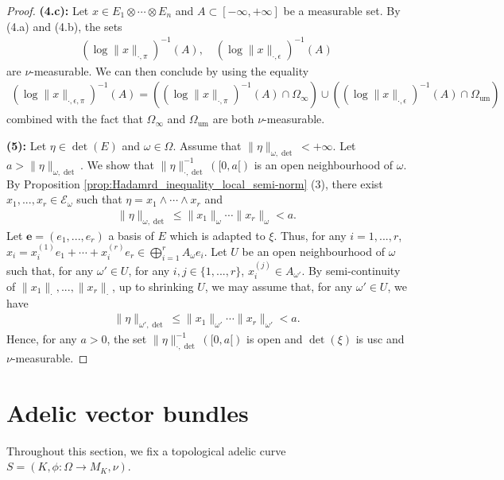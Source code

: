 \documentclass [11pt,reqno]{amsart}
\newcommand{\1}{\mathmybb{1}}
\def\cE{{\mathcal{E}}}
\def\um{\operatorname{um}}
\begin{document}
\begin{proof}
\textbf{(4.c):} Let $x\in E_1 \otimes\cdots\otimes E_n$ and $A \subset [-\infty,+\infty]$ be a measurable set. By (4.a) and (4.b), the sets
\begin{align*}
\left(\log\|x\|_{\cdot,\pi}\right)^{-1}(A), \quad \left(\log\|x\|_{\cdot,\epsilon}\right)^{-1}(A)
\end{align*}
are $\nu$-measurable. We can then conclude by using the equality
\begin{align*}
\left(\log\|x\|_{\cdot,\epsilon,\pi}\right)^{-1}(A) = \left(\left(\log\|x\|_{\cdot,\pi}\right)^{-1}(A)\cap \Omega_{\infty}\right) \cup \left(\left(\log\|x\|_{\cdot,\epsilon}\right)^{-1}(A)\cap \Omega_{\um}\right)
\end{align*}
combined with the fact that $\Omega_{\infty}$ and $\Omega_{\um}$ are both $\nu$-measurable.

\textbf{(5):} Let $\eta\in\det(E)$ and $\omega\in\Omega$. Assume that $\|\eta\|_{\omega,\det}<+\infty$. Let $a>\|\eta\|_{\omega,\det}$. We show that $\|\eta\|_{\cdot,\det}^{-1}([0,a[)$ is an open neighbourhood of $\omega$. By Proposition \ref{prop:Hadamrd_inequality_local_semi-norm} (3), there exist $x_1,...,x_r\in \cE_{\omega}$ such that $\eta=x_1\wedge\cdots\wedge x_r$ and 
\begin{align*}
\|\eta\|_{\omega,\det}\leq\|x_1\|_{\omega}\cdots\|x_r\|_{\omega} < a.
\end{align*}
Let $\mathbf{e}=(e_1,...,e_r)$ a basis of $E$ which is adapted to $\xi$. Thus, for any $i=1,...,r$, $x_i = x_{i}^{(1)}e_1 + \cdots + x_{i}^{(r)}e_r \in \bigoplus_{i=1}^{r} A_{\omega}e_i$. Let $U$ be an open neighbourhood of $\omega$ such that, for any $\omega'\in U$, for any $i,j\in \{1,...,r\}$, $x_{i}^{(j)} \in A_{\omega'}$. By semi-continuity of $\|x_1\|_{\cdot},...,\|x_r\|_{\cdot}$, up to shrinking $U$, we may assume that, for any $\omega'\in U$, we have
\begin{align*}
\|\eta\|_{\omega',\det} \leq \|x_1\|_{\omega'}\cdots\|x_r\|_{\omega'} < a. 
\end{align*} 
Hence, for any $a>0$, the set $\|\eta\|_{\cdot,\det}^{-1}([0,a[)$ is open and $\det(\xi)$ is usc and $\nu$-measurable.
\end{proof}

\section{Adelic vector bundles}
\label{sec:adelic_vector_bundle}
Throughout this section, we fix a topological adelic curve $S=(K,\phi:\Omega\to M_K, \nu)$. 
\end{document}
